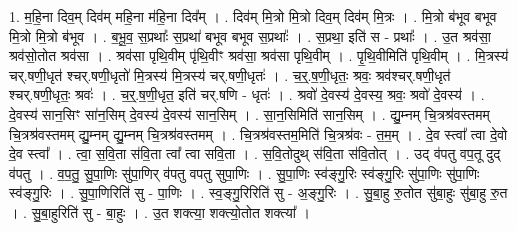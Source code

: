 \documentclass[17pt]{extarticle}
\begin{document}
1. म॒हि॒ना दिव॒म् दिव॑म् महि॒ना म॑हि॒ना दिव᳚म् । . दिव॑म् मि॒त्रो मि॒त्रो दिव॒म् दिव॑म् मि॒त्रः । . मि॒त्रो ब॑भूव बभूव मि॒त्रो मि॒त्रो ब॑भूव । . ब॒भू॒व॒ स॒प्रथाः᳚ स॒प्रथा॑ बभूव बभूव स॒प्रथाः᳚ । . स॒प्रथा॒ इति॑ स - प्रथाः᳚ । . उ॒त श्रव॑सा॒ श्रव॑सो॒तोत श्रव॑सा । . श्रव॑सा पृथि॒वीम् पृ॑थि॒वीꣳ श्रव॑सा॒ श्रव॑सा पृथि॒वीम् । . पृ॒थि॒वीमिति॑ पृथि॒वीम् । . मि॒त्रस्य॑ चर्.षणी॒धृत॑ श्चर्.षणी॒धृतो॑ मि॒त्रस्य॑ मि॒त्रस्य॑ चर्.षणी॒धृतः॑ । . च॒र्॒.ष॒णी॒धृतः॒ श्रवः॒ श्रव॑श्चर्.षणी॒धृत॑ श्चर्.षणी॒धृतः॒ श्रवः॑ । . च॒र्॒.ष॒णी॒धृत॒ इति॑ चर्.षणि - धृतः॑ । . श्रवो॑ दे॒वस्य॑ दे॒वस्य॒ श्रवः॒ श्रवो॑ दे॒वस्य॑ । . दे॒वस्य॑ सान॒सिꣳ सा॑न॒सिम् दे॒वस्य॑ दे॒वस्य॑ सान॒सिम् । . सा॒न॒सिमिति॑ सान॒सिम् । . द्यु॒म्नम् चि॒त्रश्र॑वस्तमम् चि॒त्रश्र॑वस्तमम् द्यु॒म्नम् द्यु॒म्नम् चि॒त्रश्र॑वस्तमम् । . चि॒त्रश्र॑वस्तम॒मिति॑ चि॒त्रश्र॑वः - त॒म॒म् । . दे॒व स्त्वा᳚ त्वा दे॒वो दे॒व स्त्वा᳚ । . त्वा॒ स॒वि॒ता स॑वि॒ता त्वा᳚ त्वा सवि॒ता । . स॒वि॒तोदुथ् स॑वि॒ता स॑वि॒तोत् । . उद् व॑पतु वप॒तू दुद् व॑पतु । . व॒प॒तु॒ सु॒पा॒णिः सु॑पा॒णिर् व॑पतु वपतु सुपा॒णिः । . सु॒पा॒णिः स्व॑ङ्गु॒रिः स्व॑ङ्गु॒रिः सु॑पा॒णिः सु॑पा॒णिः स्व॑ङ्गु॒रिः । . सु॒पा॒णिरिति॑ सु - पा॒णिः । . स्व॒ङ्गु॒रिरिति॑ सु - अ॒ङ्गु॒रिः । . सु॒बा॒हु रु॒तोत सु॑बा॒हुः सु॑बा॒हु रु॒त । . सु॒बा॒हुरिति॑ सु - बा॒हुः । . उ॒त शक्त्या॒ शक्त्यो॒तोत शक्त्या᳚ । \newline
\end{document}
